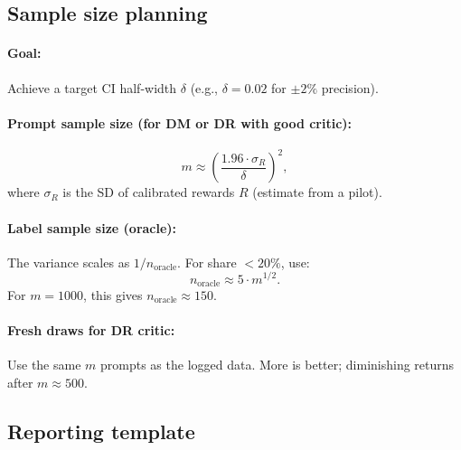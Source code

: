 \subsection{Sample size planning}

\paragraph{Goal:} Achieve a target CI half-width $\delta$ (e.g., $\delta = 0.02$ for $\pm 2\%$ precision).

\paragraph{Prompt sample size (for DM or DR with good critic):}
\begin{equation}
m \approx \left( \frac{1.96 \cdot \sigma_R}{\delta} \right)^2,
\end{equation}
where $\sigma_R$ is the SD of calibrated rewards $R$ (estimate from a pilot).

\paragraph{Label sample size (oracle):}
The \oua{} variance scales as $1 / n_{\text{oracle}}$. For \oua{} share $< 20\%$, use:
\begin{equation}
n_{\text{oracle}} \approx 5 \cdot m^{1/2}.
\end{equation}
For $m = 1000$, this gives $n_{\text{oracle}} \approx 150$.

\paragraph{Fresh draws for DR critic:}
Use the same $m$ prompts as the logged data. More is better; diminishing returns after $m \approx 500$.

\subsection{Reporting template}

